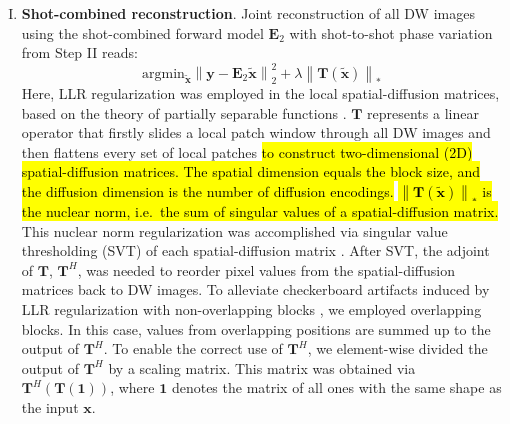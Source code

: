 \documentclass[preprint,12pt,authoryear,review]{elsarticle}
\begin{document}
\begin{enumerate}[I.]
        \item \textbf{Shot-combined reconstruction}.
        Joint reconstruction of all DW images using
        the shot-combined forward model $\mathbf{E}_2$
        with shot-to-shot phase variation from Step II reads:
        \begin{equation}
            \mathrm{argmin}_\mathbf{\tilde{x}} \left\| \mathbf{y} - \mathbf{E}_2 \mathbf{\tilde{x}} \right\|_2^2
            + \lambda \left\| \mathbf{T} ( \mathbf{\tilde{x}} ) \right\|_*
            \label{EQU:solve_dwi}
        \end{equation}
    	Here, LLR regularization was employed in the local spatial-diffusion matrices,
    	based on the theory of partially separable functions
    	\citep{liang_2007_psf,trzasko_2011_lr,zhang_2015_llr}.
    	$\mathbf{T}$ represents a linear operator that
        firstly slides a local patch window
    	through all DW images and then
    	flattens every set of local patches
    	\hl{to construct two-dimensional (2D) spatial-diffusion matrices.
        The spatial dimension equals the block size,
        and the diffusion dimension is the number of diffusion encodings.}
        \hl{$\left\| \mathbf{T} ( \mathbf{\tilde{x}} ) \right\|_*$
        is the nuclear norm, i.e.~the sum of singular values
        of a spatial-diffusion matrix.} 
    	This nuclear norm regularization was accomplished via
    	singular value thresholding (SVT) of each spatial-diffusion matrix
        \citep{cai_2010_svt}.
        After SVT, the adjoint of $\mathbf{T}$, $\mathbf{T}^H$,
        was needed to reorder
        pixel values from the spatial-diffusion matrices
        back to DW images.
        To alleviate checkerboard artifacts induced
        by LLR regularization with non-overlapping blocks
        \citep{hu_2020_spa_llr},
        we employed overlapping blocks.
        In this case, values from overlapping positions are summed up
        to the output of $\mathbf{T}^H$.
        To enable the correct use of $\mathbf{T}^H$,
        we element-wise divided the output of $\mathbf{T}^H$
        by a scaling matrix. This matrix was obtained via
        $\mathbf{T}^H (\mathbf{T}(\mathbf{1}))$,
        where $\mathbf{1}$ denotes the matrix of all ones
    	with the same shape as the input $\mathbf{x}$.



\end{enumerate}
\end{document}

